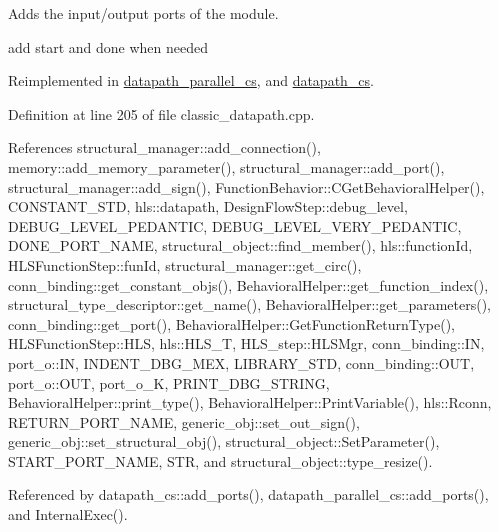 Adds the input/output ports of the module. 

add start and done when needed 

Reimplemented in \hyperlink{classdatapath__parallel__cs_af4ae83a9ee67fb9c5f2cdc6f7f5678a4}{datapath\+\_\+parallel\+\_\+cs}, and \hyperlink{classdatapath__cs_af1a3075eb56ee8636b95a1c4114bbe70}{datapath\+\_\+cs}.



Definition at line 205 of file classic\+\_\+datapath.\+cpp.



References structural\+\_\+manager\+::add\+\_\+connection(), memory\+::add\+\_\+memory\+\_\+parameter(), structural\+\_\+manager\+::add\+\_\+port(), structural\+\_\+manager\+::add\+\_\+sign(), Function\+Behavior\+::\+C\+Get\+Behavioral\+Helper(), C\+O\+N\+S\+T\+A\+N\+T\+\_\+\+S\+TD, hls\+::datapath, Design\+Flow\+Step\+::debug\+\_\+level, D\+E\+B\+U\+G\+\_\+\+L\+E\+V\+E\+L\+\_\+\+P\+E\+D\+A\+N\+T\+IC, D\+E\+B\+U\+G\+\_\+\+L\+E\+V\+E\+L\+\_\+\+V\+E\+R\+Y\+\_\+\+P\+E\+D\+A\+N\+T\+IC, D\+O\+N\+E\+\_\+\+P\+O\+R\+T\+\_\+\+N\+A\+ME, structural\+\_\+object\+::find\+\_\+member(), hls\+::function\+Id, H\+L\+S\+Function\+Step\+::fun\+Id, structural\+\_\+manager\+::get\+\_\+circ(), conn\+\_\+binding\+::get\+\_\+constant\+\_\+objs(), Behavioral\+Helper\+::get\+\_\+function\+\_\+index(), structural\+\_\+type\+\_\+descriptor\+::get\+\_\+name(), Behavioral\+Helper\+::get\+\_\+parameters(), conn\+\_\+binding\+::get\+\_\+port(), Behavioral\+Helper\+::\+Get\+Function\+Return\+Type(), H\+L\+S\+Function\+Step\+::\+H\+LS, hls\+::\+H\+L\+S\+\_\+T, H\+L\+S\+\_\+step\+::\+H\+L\+S\+Mgr, conn\+\_\+binding\+::\+IN, port\+\_\+o\+::\+IN, I\+N\+D\+E\+N\+T\+\_\+\+D\+B\+G\+\_\+\+M\+EX, L\+I\+B\+R\+A\+R\+Y\+\_\+\+S\+TD, conn\+\_\+binding\+::\+O\+UT, port\+\_\+o\+::\+O\+UT, port\+\_\+o\+\_\+K, P\+R\+I\+N\+T\+\_\+\+D\+B\+G\+\_\+\+S\+T\+R\+I\+NG, Behavioral\+Helper\+::print\+\_\+type(), Behavioral\+Helper\+::\+Print\+Variable(), hls\+::\+Rconn, R\+E\+T\+U\+R\+N\+\_\+\+P\+O\+R\+T\+\_\+\+N\+A\+ME, generic\+\_\+obj\+::set\+\_\+out\+\_\+sign(), generic\+\_\+obj\+::set\+\_\+structural\+\_\+obj(), structural\+\_\+object\+::\+Set\+Parameter(), S\+T\+A\+R\+T\+\_\+\+P\+O\+R\+T\+\_\+\+N\+A\+ME, S\+TR, and structural\+\_\+object\+::type\+\_\+resize().



Referenced by datapath\+\_\+cs\+::add\+\_\+ports(), datapath\+\_\+parallel\+\_\+cs\+::add\+\_\+ports(), and Internal\+Exec().

